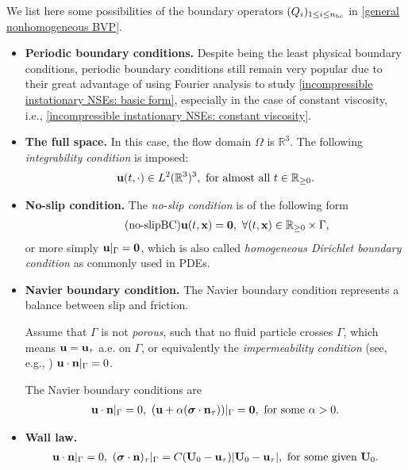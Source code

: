 \documentclass[oneside,11pt]{book}
\numberwithin{equation}{section}
\begin{document}
We list here some possibilities of the boundary operators $(Q_i)_{1\le i\le n_{\rm bc}}$ in \eqref{general nonhomogeneous BVP}.
\begin{itemize}
    \item \textbf{Periodic boundary conditions.} Despite being the least physical boundary conditions, periodic boundary conditions still remain very popular due to their great advantage of using Fourier analysis to study \eqref{incompressible instationary NSEs: basic form}, especially in the case of constant viscosity, i.e., \eqref{incompressible instationary NSEs: constant viscosity}.
    \item \textbf{The full space.} In this case, the flow domain $\Omega$ is $\mathbb{R}^3$. The following \textit{integrability condition} is imposed:
    \begin{align*}
        {\bf u}(t,\cdot)\in L^2(\mathbb{R}^3)^3,\mbox{ for almost all } t\in\mathbb{R}_{\ge 0}.
    \end{align*}
    \item \textbf{No-slip condition.} The \textit{no-slip condition} is of the following form
    \begin{align}
        \label{no-slip BC}
        \tag{no-slipBC}
        {\bf u}(t,{\bf x}) = {\bf 0},\ \forall(t,{\bf x})\in\mathbb{R}_{\ge 0}\times\Gamma,
    \end{align}
    or more simply ${\bf u}|_\Gamma = {\bf 0}$, which is also called \textit{homogeneous Dirichlet boundary condition} as commonly used in PDEs.
    \item \textbf{Navier boundary condition.} The Navier boundary condition represents a balance between slip and friction.
    
    Assume that $\Gamma$ is not \textit{porous}, such that no fluid particle crosses $\Gamma$, which means ${\bf u} = {\bf u}_\tau$ a.e. on $\Gamma$, or equivalently the \textit{impermeability condition} (see, e.g., \cite[Sect. 2.4]{Pope2000}) ${\bf u}\cdot{\bf n}|_\Gamma = 0$.
    
    The Navier boundary conditions are
    \begin{align*}
        {\bf u}\cdot{\bf n}|_\Gamma = 0,\ ({\bf u} + \alpha(\boldsymbol{\sigma}\cdot{\bf n}_\tau))|_\Gamma = {\bf 0},\mbox{ for some }\alpha > 0.
    \end{align*}
    \item \textbf{Wall law.}
    \begin{align*}
        {\bf u}\cdot{\bf n}|_\Gamma = 0,\ (\boldsymbol{\sigma}\cdot{\bf n})_\tau|_\Gamma = C({\bf U}_0 - {\bf u}_\tau)|{\bf U}_0 - {\bf u}_\tau|,\mbox{ for some given }{\bf U}_0.
    \end{align*}
\end{itemize}
\end{document}
